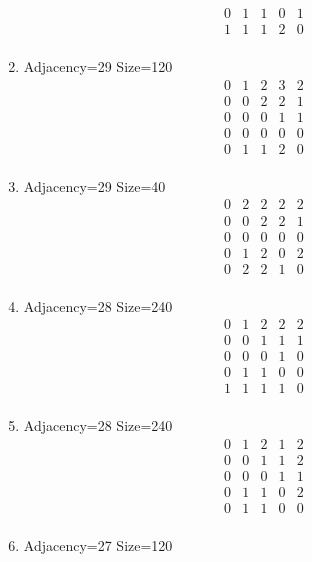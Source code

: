 \documentclass[12pt]{article}
\begin{document}
\begin{multicols}{3}
\begin{enumerate}
\begin{equation*}
\begin{array}{ccccc}
0&1&1&0&1\\
1&1&1&2&0\\
\end{array}
\end{equation*}
\item Adjacency=29 Size=120
\begin{equation*}
\begin{array}{ccccc}
0&1&2&3&2\\
0&0&2&2&1\\
0&0&0&1&1\\
0&0&0&0&0\\
0&1&1&2&0\\
\end{array}
\end{equation*}
\item Adjacency=29 Size=40
\begin{equation*}
\begin{array}{ccccc}
0&2&2&2&2\\
0&0&2&2&1\\
0&0&0&0&0\\
0&1&2&0&2\\
0&2&2&1&0\\
\end{array}
\end{equation*}
\item Adjacency=28 Size=240
\begin{equation*}
\begin{array}{ccccc}
0&1&2&2&2\\
0&0&1&1&1\\
0&0&0&1&0\\
0&1&1&0&0\\
1&1&1&1&0\\
\end{array}
\end{equation*}
\item Adjacency=28 Size=240
\begin{equation*}
\begin{array}{ccccc}
0&1&2&1&2\\
0&0&1&1&2\\
0&0&0&1&1\\
0&1&1&0&2\\
0&1&1&0&0\\
\end{array}
\end{equation*}
\item Adjacency=27 Size=120
\begin{equation*}
\begin{array}{ccccc}

\end{array}
\end{equation*}
\end{enumerate}
\end{multicols}
\end{document}
